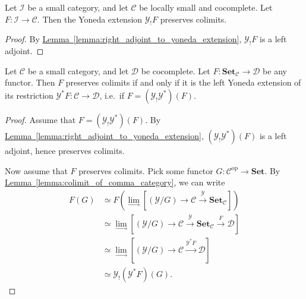 \documentclass[main.tex]{subfiles}
\begin{document}
\begin{corollary}
  \label{cor:yoneda_extension_results_in_cocontinuous_functor}
  Let $\mathcal{I}$ be a small category, and let $\mathcal{C}$ be locally small and cocomplete. Let $F\colon \mathcal{I} \to \mathcal{C}$. Then the Yoneda extension $\mathcal{Y}_{!}F$ preserves colimits.
\end{corollary}
\begin{proof}
  By \hyperref[lemma:right_adjoint_to_yoneda_extension]{Lemma~\ref*{lemma:right_adjoint_to_yoneda_extension}}, $\mathcal{Y}_{!}F$ is a left adjoint.
\end{proof}

\begin{theorem}
  \label{thm:yoneda_extension_of_restriction_preserves_colimits}
  Let $\mathcal{C}$ be a small category, and let $\mathcal{D}$ be cocomplete. Let $F\colon \mathbf{Set}_{\mathcal{C}} \to \mathcal{D}$ be any functor. Then $F$ preserves colimits if and only if it is the left Yoneda extension of its restriction $\mathcal{Y}^{*}F \colon \mathcal{C} \to \mathcal{D}$, i.e.\ if $F = (\mathcal{Y}_{!}\mathcal{Y}^{*})(F)$.
\end{theorem}
\begin{proof}
  Assume that $F = (\mathcal{Y}_{!}\mathcal{Y}^{*})(F)$. By \hyperref[lemma:right_adjoint_to_yoneda_extension]{Lemma~\ref*{lemma:right_adjoint_to_yoneda_extension}}, $(\mathcal{Y}_{!}\mathcal{Y}^{*})(F)$ is a left adjoint, hence preserves colimits.

  Now assume that $F$ preserves colimits. Pick some functor $G\colon \mathcal{C}^{\mathrm{op}} \to \mathbf{Set}$. By \hyperref[lemma:colimit_of_comma_category]{Lemma~\ref*{lemma:colimit_of_comma_category}}, we can write
  \begin{align*}
    F(G) &\simeq F\left( \lim_{\rightarrow}\left[ (\mathcal{Y} / G) \to \mathcal{C} \overset{\mathcal{Y}}{\to} \mathbf{Set}_{\mathcal{C}} \right] \right) \\
    &\simeq \lim_{\rightarrow} \left[ (\mathcal{Y} / G) \to \mathcal{C} \overset{\mathcal{Y}}{\to} \mathbf{Set}_{\mathcal{C}}  \overset{F}{\to} \mathcal{D} \right] \\
    &\simeq \lim_{\rightarrow} \left[ (\mathcal{Y} / G) \to \mathcal{C} \overset{\mathcal{Y}^{*}F}{\to} \mathcal{D} \right] \\
    &\simeq \mathcal{Y}_{!}(\mathcal{Y}^{*}F)(G).
  \end{align*}
\end{proof}
\end{document}
